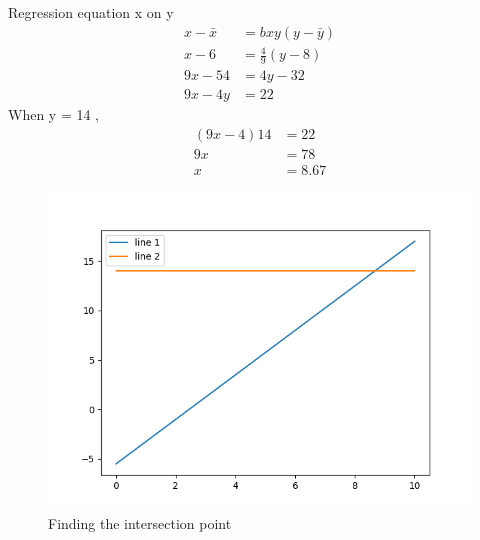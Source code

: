 \documentclass[journal,12pt,twocolumn]{IEEEtran}
\begin{document}
Regression equation x on y\\
\begin{align*}
x - \bar{x} &= bxy( y -\bar{y} )\\
x - 6       &= \frac{4}{9} ( y - 8)\\
9x - 54     &= 4y - 32\\
9x - 4y     &= 22
\end{align*}
When y = 14 ,
\begin{align*}
(9x - 4) 14 &= 22\\
         9x &= 78\\
          x &= 8.67
\end{align*}
\begin{figure}[h]
\centering
\includegraphics[width=\columnwidth]{fig1.png}
\caption{Finding the intersection point}
\label{Fig1}
\end{figure}
\end{document}
